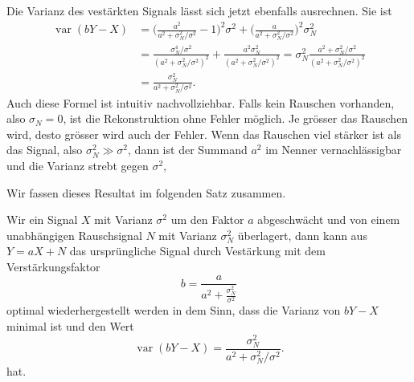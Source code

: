 Die Varianz des vestärkten Signals lässt sich jetzt ebenfalls
ausrechnen.
Sie ist
\begin{align*}
\operatorname{var}(bY-X)
&=
\biggl(\frac{a^2}{a^2+\sigma_N^2/\sigma^2}-1\biggr)^2\sigma^2
+
\biggl(\frac{a}{a^2+\sigma_N^2/\sigma^2}\biggr)^2 \sigma_N^2
\\
&=
\frac{\sigma_N^4/\sigma^2}{(a^2+\sigma_N^2/\sigma^2)^2}
+
\frac{a^2\sigma_N^2}{(a^2+\sigma_N^2/\sigma^2)^2}
=
\sigma_N^2\frac{a^2+\sigma_N^2/\sigma^2}{(a^2+\sigma_N^2/\sigma^2)^2}
\\
&=
\frac{\sigma_N^2}{a^2+\sigma_N^2/\sigma^2}.
\end{align*}
Auch diese Formel ist intuitiv nachvollziehbar.
Falls kein Rauschen vorhanden, also $\sigma_N=0$, ist die Rekonstruktion
ohne Fehler möglich.
Je grösser das Rauschen wird, desto grösser wird auch der Fehler.
Wenn das Rauschen viel stärker ist als das Signal,
also $\sigma_N^2 \gg \sigma^2$, dann ist der Summand $a^2$ im
Nenner vernachlässigbar und die Varianz strebt gegen $\sigma^2$,


Wir fassen dieses Resultat im folgenden Satz zusammen.

\begin{satz}[Wiener]
\label{filter:wiener:primitiv}
Wir ein Signal $X$ mit Varianz $\sigma^2$ um den Faktor $a$ abgeschwächt
und von einem unabhängigen Rauschsignal $N$ mit Varianz $\sigma_N^2$
überlagert, dann kann aus $Y=aX+N$ das ursprüngliche Signal durch
Vestärkung mit dem Verstärkungsfaktor
\[
b=\frac{a}{a^2 + \displaystyle\frac{\sigma_N^2}{\sigma^2}}
\]
optimal wiederhergestellt werden in dem Sinn, dass die Varianz
von $bY-X$ minimal ist und den Wert
\[
\operatorname{var}(bY-X)
=
\frac{\sigma_N^2}{a^2+\sigma_N^2/\sigma^2}.
\]
hat.
\end{satz}





